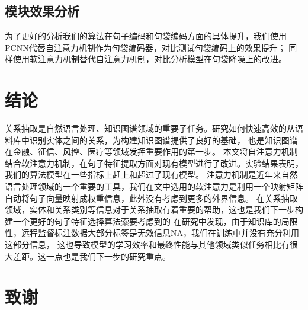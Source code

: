 \documentclass[UTF8]{csoarticle}
\begin{document}
\subsection{模块效果分析}
为了更好的分析我们的算法在句子编码和句袋编码方面的具体提升，我们使用PCNN代替自注意力机制作为句袋编码器，对比测试句袋编码上的效果提升；
同样使用软注意力机制替代自注意力机制，对比分析模型在句袋降噪上的改进。
\section{结论}
关系抽取是自然语言处理、知识图谱领域的重要子任务。研究如何快速高效的从语料库中识别实体之间的关系，为构建知识图谱提供了良好的基础，
也是知识图谱在金融、征信、风控、医疗等领域发挥重要作用的第一步。
本文将自注意力机制结合软注意力机制，在句子特征提取方面对现有模型进行了改进。实验结果表明，我们的算法模型在一些指标上赶上和超过了现有模型。
注意力机制是近年来自然语言处理领域的一个重要的工具，我们在文中选用的软注意力是利用一个映射矩阵自动将句子向量映射成权重信息，此外没有考虑到更多的外界信息。
在关系抽取领域，实体和关系类别等信息对于关系抽取有着重要的帮助，这也是我们下一步构建一个更好的句子特征选择算法索要考虑到的
在研究中发现，由于知识库的局限性，远程监督标注数据大部分标签是无效信息NA，我们在训练中并没有充分利用这部分信息，
这也导致模型的学习效率和最终性能与其他领域类似任务相比有很大差距。这一点也是我们下一步的研究重点。
\section*{致谢}


\end{document}
